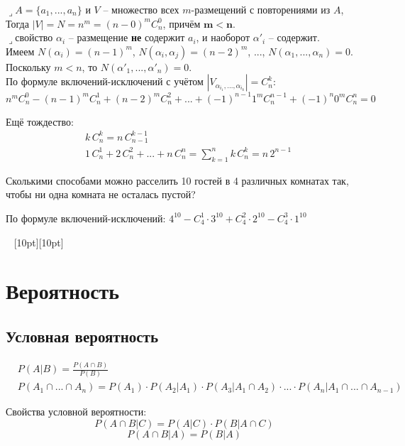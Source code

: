 \documentclass[a4paper,12pt,fleqn]{article}
\newenvironment{onsamepage} {\begin{minipage}{\textwidth}} {\end{minipage}}
\numberwithin{figure}{section}
\theoremstyle{definition}
\def\lets{{\huge$\lrcorner$}\space}
\def\vignette{\vspace{48pt} \noindent \hrulefill~
	          \raisebox{-8pt}[10pt][10pt]{\Huge\ding{102}}
	          ~\hrulefill}
\begin{document}
\bigskip
\begin{onsamepage}
\lets $A=\{a_1,...,a_n\}$ и $V$ -- множество всех $m$-размещений с повторениями из $A$, \\
Тогда $|V| = N = n^m = (n-0)^m C_n^0$, причём $\pmb{m<n}$. \\
\lets свойство $\alpha_i$ -- размещение \textbf{не} содержит $a_i$,
      и наоборот $\alpha'_i$ -- содержит. \\
Имеем $N(\alpha_i)=(n-1)^m$,
      $N(\alpha_i,\alpha_j)=(n-2)^m$, ...,
      $N(\alpha_1,...,\alpha_n)=0$. \\
Поскольку $m<n$, то $N(\alpha'_1,...,\alpha'_n)=0$. \\
По формуле включений-исключений с учётом
	$|V_{\alpha_{i_1},...,\alpha_{i_k}}| = C_n^k$:
\[ n^m C_n^0 - (n-1)^m C_n^1 + (n-2)^m C_n^2
   + ... + (-1)^{n-1} 1^m C_n^{n-1} + (-1)^n 0^m C_n^n = 0 \]
\end{onsamepage}

\medspace
Ещё тождество:
\begin{align*}
&	k \, C_n^k = n \, C_{n-1}^{k-1}		\\
&	1 \, C_n^1 + 2 \, C_n^2 + ... + n \, C_n^n = \sum_{k=1}^n k \, C_n^k = n \, 2^{n-1}
\end{align*}

\begin{onsamepage}
\begin{problem}
	Сколькими способами можно расселить 10 гостей в 4 различных комнатах
	так, чтобы ни одна комната не осталась пустой?
\end{problem}
\begin{solution}
	По формуле включений-исключений:
	$4^{10} - C_4^1 \cdot 3^{10} + C_4^2 \cdot 2^{10} - C_4^3 \cdot 1^{10}$
\end{solution}
\end{onsamepage}


\vignette
\section{Вероятность}

\subsection{Условная вероятность}

\begin{onsamepage}
\begin{align*}
&	P(A|B) = \frac{P(A \cap B)}{P(B)}
\\&	P(A_1 \cap ... \cap A_n)
	= P(A_1) \cdot P(A_2|A_1) \cdot P(A_3|A_1 \cap A_2)
	  \cdot ... \cdot P(A_n|A_1 \cap ... \cap A_{n-1})
\end{align*}

Свойства условной вероятности:
\[ P(A \cap B|C) = P(A|C) \cdot P(B|A \cap C) \]
\[ P(A \cap B|A) = P(B|A) \]
\end{onsamepage}
\end{document}
